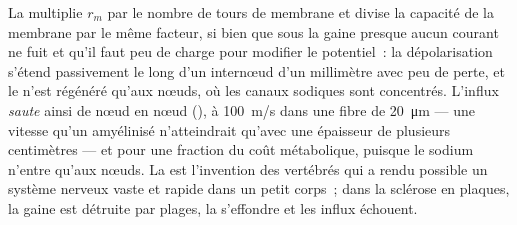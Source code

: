 \begin{proposition}\label{prop:b2:neurons-synapses:myelin}
La  multiplie $r_m$ par le nombre de tours de membrane et divise
la capacité de la membrane par le même facteur, si bien que sous la
gaine presque aucun courant ne fuit et qu'il faut peu de charge pour
modifier le potentiel~: la dépolarisation s'étend passivement le long
d'un internœud d'un millimètre avec peu de perte, et le  n'est régénéré qu'aux nœuds, où les canaux sodiques sont
concentrés. L'influx \emph{saute} ainsi de nœud en nœud
(\emph{}), à \qty{100}{m/s} dans une fibre de
\qty{20}{\micro m} --- une vitesse qu'un  amyélinisé
n'atteindrait qu'avec une épaisseur de plusieurs centimètres --- et pour
une fraction du coût métabolique, puisque le sodium n'entre qu'aux
nœuds. La  est l'invention des vertébrés qui a rendu possible un
système nerveux vaste et rapide dans un petit corps~; dans la sclérose en
plaques, la gaine est détruite par plages, la 
s'effondre et les influx échouent.
\end{proposition}

